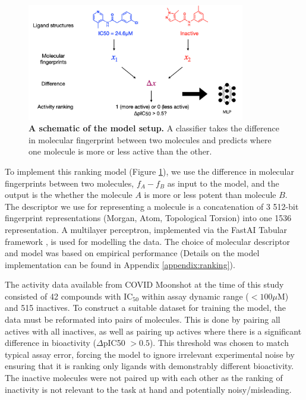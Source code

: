 \begin{figure}[!th]
 \centering
 \includegraphics[width=0.85\textwidth]{Chapters/Ranking/Figs/schematic.png}
 \caption{\textbf{A schematic of the model setup.} A classifier takes the difference in molecular fingerprint between two molecules and predicts where one molecule is more or less active than the other.}
 \label{fig:ranking_schematic}
\end{figure}

To implement this ranking model (Figure \ref{fig:ranking_schematic}), we use the difference in molecular fingerprints between two molecules, $f_A - f_B$ as input to the model, and the output is the whether the molecule $A$ is more or less potent than molecule $B$. The descriptor we use for representing a molecule is a concatenation of 3 512-bit fingerprint representations (Morgan, Atom, Topological Torsion) into one 1536 representation. A multilayer perceptron, implemented via the FastAI Tabular framework \cite{howard2018fastai}, is used for modelling the data. The choice of molecular descriptor and model was based on empirical performance (Details on the model implementation can be found in Appendix \ref{appendix:ranking}). %

The activity data available from COVID Moonshot at the time of this study consisted of 42 compounds with $\mathrm{IC}_{50}$ within assay dynamic range ($<100 \mu$M) and 515 inactives. To construct a suitable dataset for training the model, the data must be reformated into pairs of molecules. This is done by pairing all actives with all inactives, as well as pairing up actives where there is a significant difference in bioactivity ($\Delta$pIC50 $>0.5$). This threshold was chosen to match typical assay error, forcing the model to ignore irrelevant experimental noise by ensuring that it is ranking only ligands with demonstrably different bioactivity. The inactive molecules were not paired up with each other as the ranking of inactivity is not relevant to the task at hand and potentially noisy/misleading.

